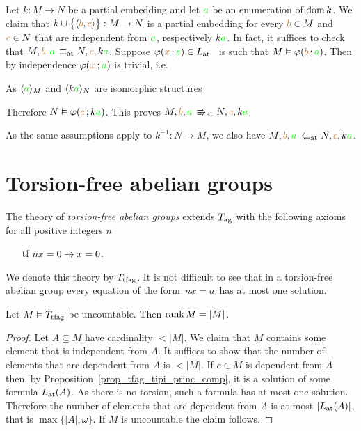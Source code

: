 \begin{remark}\label{oss_liberi_qf}
  Let $k:M\to N$ be a partial embedding and let ${\gr a}$ be an enumeration of $\dom k$.
  We claim that  $k\cup\big\{\<{\mr b},{\mr c}\>\big\}:M\to N$ is a partial embedding for every ${\mr b}\in M$ and ${\mr c}\in N$ that are independent from ${\gr a}$, respectively $k{\gr a}$.
  In fact, it suffices to check that $M,{\mr b},{\gr a}\,\equiv_{\rm at}N, {\mr c},k{\gr a}$.
  Suppose $\phi({\mr x}\,;{\gr z})\in L_{\rm at}$ \ is such that $M\models\phi({\mr b}\,;{\gr a})$.
  Then by independence $\phi({\mr x}\,;{\gr a})$ is trivial, i.e.


  As $\<{\gr a}\>_M$ and  $\<k{\gr a}\>_N$ are isomorphic structures 


  Therefore $N\models\phi({\mr c}\,;k{\gr a})$.
  This proves $M,{\mr b},{\gr a}\,\Rrightarrow_{\rm at}N, {\mr c},k{\gr a}$.
  
  As the same assumptions apply to $k^{-1}:N\to M$, we also have $M,{\mr b},{\gr a}\,\Lleftarrow_{\rm at}N, {\mr c},k{\gr a}$. 
\end{remark}

\section{Torsion-free abelian groups}

The theory of \emph{torsion-free abelian groups\/} extends $T_{\rm ag}$ with the following axioms for all positive integers $n$
\begin{itemize}
\item[tf] $nx= 0\imp x=0$.
\end{itemize}
We denote this theory by \emph{$T_{\rm tfag}$}.
%
It is not difficult to see that in a torsion-free abelian group every equation of the form $\,nx = a\,$ has at most one solution.

\begin{proposition}
Let $M\models T_{\rm tfag}$ be uncountable.
%
Then $\rank M=|M|$.

\end{proposition}

\begin{proof}
  Let $A\subseteq M$ have cardinality $<|M|$.
%
  We claim that $M$ contains some element that is independent from $A$.
%
  It suffices to show that the number of elements that are dependent from $A$ is $<|M|$.
%
  If $c\in M$ is dependent from $A$ then, by Proposition~\ref{prop_tfag_tipi_princ_comp}, it is a solution of some formula $L_{\rm at}(A)$.
%
  As there is no torsion, such a formula has at most one solution.
%
  Therefore the number of elements that are dependent from $A$ is at most $|L_{\rm at}(A)|$, that is $\max\big\{|A|,\omega\big\}$.
%
  If $M$ is uncountable the claim follows.
\end{proof}

